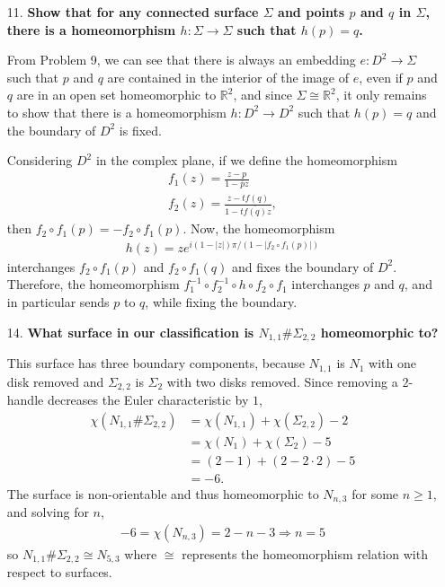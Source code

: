 \documentclass[a4paper,12pt]{article}
\begin{document}
\begin{enumerate}
    \item[11.]
        \boldmath\textbf{Show that for any connected surface $\Sigma$ and points $p$ and $q$ in $\Sigma$, there is a homeomorphism $h : \Sigma \to \Sigma$ such that $h(p) = q$.
        }\unboldmath \par
        From Problem 9, we can see that there is always an embedding $e : D^2 \to \Sigma$ such that $p$ and $q$ are contained in the interior of the image of $e$, even if $p$ and $q$ are in an open set homeomorphic to $\mathbb{R}^2$, and since $\Sigma \cong \mathbb{R}^2$, it only remains to show that there is a homeomorphism $h : D^2 \to D^2$ such that $h(p) = q$ and the boundary of $D^2$ is fixed. \par
        Considering $D^2$ in the complex plane, if we define the homeomorphism
        \begin{gather*}
            f_1(z) = \frac{z - p}{1 - \overline{p} z} \\
            f_2(z) = \frac{z - t f(q)}{1 - t\overline{f(q)} z},
        \end{gather*}
        then $f_2 \circ f_1(p) = -f_2 \circ f_1(p)$. Now, the homeomorphism
        \begin{align*}
            h(z) = ze^{i(1 - |z|)\pi/(1 - |f_2 \circ f_1(p)|)}
        \end{align*}
        interchanges $f_2 \circ f_1(p)$ and $f_2 \circ f_1(q)$ and fixes the boundary of $D^2$. Therefore, the homeomorphism $f_1^{-1} \circ f_2^{-1} \circ h \circ f_2 \circ f_1$ interchanges $p$ and $q$, and in particular sends $p$ to $q$, while fixing the boundary.

    \item[14.]
        \boldmath\textbf{What surface in our classification is $N_{1, 1} \# \Sigma_{2, 2}$ homeomorphic to?
        }\unboldmath \par
        This surface has three boundary components, because $N_{1, 1}$ is $N_1$ with one disk removed and $\Sigma_{2, 2}$ is $\Sigma_2$ with two disks removed. Since removing a $2$-handle decreases the Euler characteristic by $1$,
        \begin{align*}
            \chi(N_{1, 1} \# \Sigma_{2, 2}) &= \chi(N_{1, 1}) + \chi(\Sigma_{2, 2}) - 2 \\
            &= \chi(N_1) + \chi(\Sigma_2) - 5 \\
            &= (2 - 1) + (2 - 2 \cdot 2) - 5 \\
            &= -6.
        \end{align*}
        The surface is non-orientable and thus homeomorphic to $N_{n, 3}$ for some $n \geq 1$, and solving for $n$,
        \begin{align*}
            -6 = \chi(N_{n, 3}) = 2 - n - 3 \Rightarrow n = 5
        \end{align*}
        so $N_{1, 1} \# \Sigma_{2, 2} \cong N_{5, 3}$ where $\cong$ represents the homeomorphism relation with respect to surfaces.


\end{enumerate}
\end{document}
